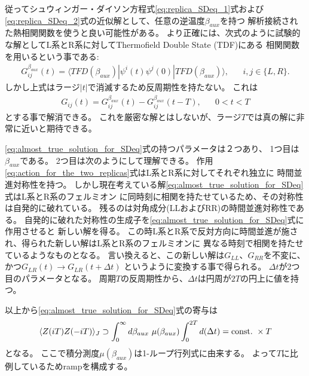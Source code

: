 従ってシュウィンガー・ダイソン方程式\eqref{eq:replica_SDeq_1}式および
\eqref{eq:replica_SDeq_2}式の近似解として、任意の逆温度$\beta_{aux}$を持つ
解析接続された熱相関関数を使うと良い可能性がある。
より正確には、次式のように試験的な解としてL系とR系に対してThermofield Double State (TDF)にある
相関関数を用いるという事である:
\begin{align}
	G_{ij}^{\beta_{aux}}(t)
	= \langle TFD(\beta_{aux})|\psi^i(t)\psi^j(0)|TFD(\beta_{aux}) \rangle,
	\hspace{20pt}i,j \in \{L, R\}.
\end{align}
しかし上式はラージ$|t|$で消滅するため反周期性を持たない。
これは
\begin{align}
	G_{ij}(t) = G_{ij}^{\beta_{aux}}(t) - G_{ij}^{\beta_{aux}}(t-T),\hspace{20pt}
	0 < t < T
	\label{eq:almost_true_solution_for_SDeq}
\end{align}
とする事で解消できる。
これを厳密な解とはしないが、ラージ$T$では真の解に非常に近いと期待できる。

\eqref{eq:almost_true_solution_for_SDeq}式の持つパラメータは２つあり、
1つ目は$\beta_{aux}$である。
2つ目は次のようにして理解できる。
作用\eqref{eq:action_for_the_two_replicas}式はL系とR系に対してそれぞれ独立に
時間並進対称性を持つ。
しかし現在考えている解\eqref{eq:almost_true_solution_for_SDeq}式はL系とR系のフェルミオン
に同時刻に相関を持たせているため、その対称性は自発的に破れている。
残るのは対角成分(LLおよびRR)の時間並進対称性である。
自発的に破れた対称性の生成子を\eqref{eq:almost_true_solution_for_SDeq}式に作用させると
新しい解を得る。
この時L系とR系で反対方向に時間並進が施され、得られた新しい解はL系とR系のフェルミオンに
異なる時刻で相関を持たせているようなものとなる。
言い換えると、この新しい解は$G_{LL}$、$G_{RR}$を不変に、かつ$G_{LR}(t) \to G_{LR}(t + \Delta t)$
というように変換する事で得られる。
$\Delta t$が2つ目のパラメータとなる。
周期$T$の反周期性から、$\Delta t$は円周が$2T$の円上に値を持つ。

以上から\eqref{eq:almost_true_solution_for_SDeq}式の寄与は
\begin{align}
	\langle Z(iT)Z(-iT) \rangle_J \supset
	\int_0^{\infty}d\beta_{aux}\ \mu(\beta_{aux})
	\int_0^{2T} d(\Delta t)
	= \mathrm{const.}\ \times T
\end{align}
となる。
ここで積分測度$\mu(\beta_{aux})$は1-ループ行列式に由来する。
よって$T$に比例しているためrampを構成する。

